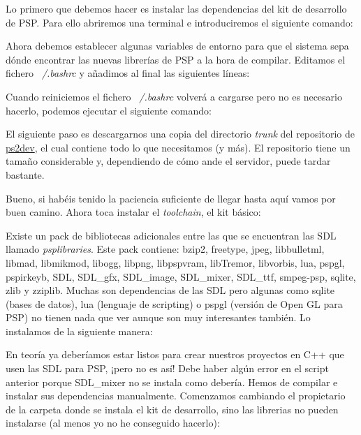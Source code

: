 Lo primero que debemos hacer es instalar las dependencias del kit de
desarrollo de PSP. Para ello abriremos una terminal e introduciremos
el siguiente comando:



Ahora debemos establecer algunas variables de entorno para que el sistema
sepa dónde encontrar las nuevas librerías de PSP a la hora de compilar.
Editamos el fichero \emph{~/.bashrc} y añadimos al final las siguientes
líneas:



Cuando reiniciemos el fichero \emph{~/.bashrc} volverá a cargarse pero no
es necesario hacerlo, podemos ejecutar el siguiente comando:



El siguiente paso es descargarnos una copia del directorio \emph{trunk}
del repositorio de \href{http://ps2dev.org}{ps2dev}, el cual contiene todo
lo que necesitamos (y más). El repositorio tiene un tamaño considerable
y, dependiendo de cómo ande el servidor, puede tardar bastante.



Bueno, si habéis tenido la paciencia suficiente de llegar hasta aquí vamos
por buen camino. Ahora toca instalar el \emph{toolchain}, el kit básico:



Existe un pack de bibliotecas adicionales entre las que se encuentran las
SDL llamado \emph{psplibraries}. Este pack contiene: bzip2, freetype, jpeg,
libbulletml, libmad, libmikmod, libogg, libpng, libpspvram, libTremor,
libvorbis, lua, pspgl, pspirkeyb, SDL, SDL\_gfx, SDL\_image, SDL\_mixer,
SDL\_ttf, smpeg-psp, sqlite, zlib y zziplib. Muchas son dependencias de las
SDL pero algunas como sqlite (bases de datos), lua (lenguaje de scripting) 
o pspgl (versión de Open GL para PSP) no tienen nada que ver aunque son muy
interesantes también. Lo instalamos de la siguiente manera:
 


En teoría ya deberíamos estar listos para crear nuestros proyectos en C++
que usen las SDL para PSP, ¡pero no es así! Debe haber algún error en el
script anterior porque SDL\_mixer no se instala como debería. Hemos de
compilar e instalar sus dependencias manualmente. Comenzamos cambiando
el propietario de la carpeta donde se instala el kit de desarrollo, sino
las librerias no pueden instalarse (al menos yo no he conseguido hacerlo):

